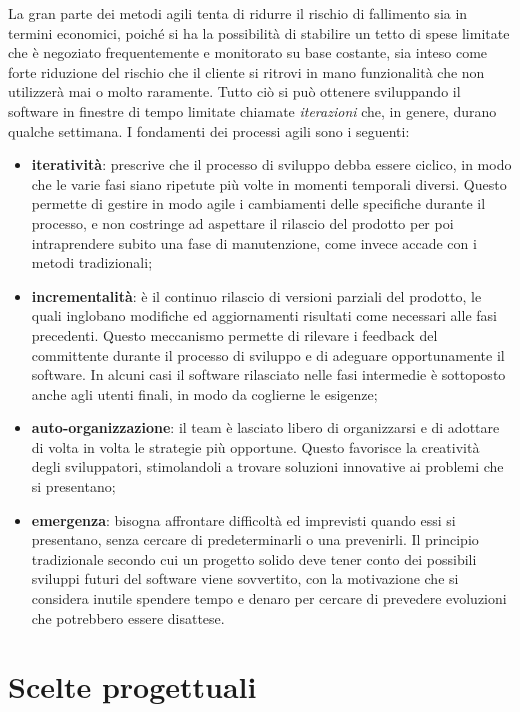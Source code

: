 La gran parte dei metodi agili tenta di ridurre il rischio di fallimento sia in termini economici, poiché si ha la possibilità di stabilire un tetto di spese limitate che è negoziato frequentemente e monitorato su base costante, sia inteso come forte riduzione del rischio che il cliente si ritrovi in mano funzionalità che non utilizzerà mai o molto raramente. Tutto ciò si può ottenere sviluppando il software in finestre di tempo limitate chiamate \textit{iterazioni} che, in genere, durano qualche settimana.
I fondamenti dei processi agili sono i seguenti:
\begin{itemize}
\item \textbf{iteratività}: prescrive che il processo di sviluppo debba essere ciclico, in modo che le varie fasi siano ripetute più volte in momenti temporali diversi. Questo permette di gestire in modo agile i cambiamenti delle specifiche durante il processo, e non costringe ad aspettare il rilascio del prodotto per poi intraprendere subito una fase di manutenzione, come invece accade con i metodi tradizionali;
\item \textbf{incrementalità}: è il continuo rilascio di versioni parziali del prodotto, le quali inglobano modifiche ed aggiornamenti risultati come necessari alle fasi precedenti. Questo meccanismo permette di rilevare i feedback del committente durante il processo di sviluppo e di adeguare opportunamente il software. In alcuni casi il software rilasciato nelle fasi intermedie è sottoposto anche agli utenti finali, in modo da coglierne le esigenze;
\item \textbf{auto-organizzazione}: il team è lasciato libero di organizzarsi e di adottare di volta in volta le strategie più opportune. Questo favorisce la creatività degli sviluppatori, stimolandoli a trovare soluzioni innovative ai problemi che si presentano;
\item \textbf{emergenza}: bisogna affrontare difficoltà ed imprevisti quando essi si presentano, senza cercare di predeterminarli o una prevenirli. Il principio tradizionale secondo cui un progetto solido deve tener conto dei possibili sviluppi futuri del software viene sovvertito, con la motivazione che si considera inutile spendere tempo e denaro per cercare di prevedere evoluzioni che potrebbero essere disattese.
\end{itemize}
\section{Scelte progettuali}
